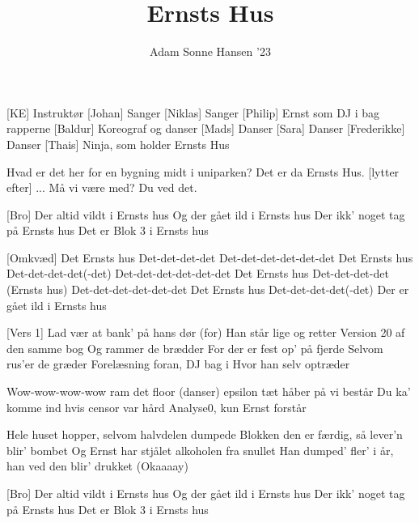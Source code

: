 \documentclass[a4paper,11pt]{article}
\title{Ernsts Hus}
\author{Adam Sonne Hansen ’23}
\begin{document}
\maketitle

\begin{roles}
[KE] Instruktør
[Johan] Sanger
[Niklas] Sanger
[Philip] Ernst som DJ i bag rapperne
[Baldur] Koreograf og danser
[Mads] Danser
[Sara] Danser
[Frederikke] Danser 
[Thais] Ninja, som holder Ernsts Hus
\end{roles}

\begin{song}

 Hvad er det her for en bygning midt i uniparken? 
 Det er da Ernsts Hus.
 [lytter efter] ... Må vi være med?
 Du ved det.

[Bro] Der altid vildt i Ernsts hus
 Og der gået ild i Ernsts hus
 Der ikk’ noget tag på Ernsts hus
Det er Blok 3 i Ernsts hus

[Omkvæd] Det Ernsts hus
Det-det-det-det
Det-det-det-det-det-det
Det Ernsts hus
Det-det-det-det(-det)
Det-det-det-det-det-det
Det Ernsts hus
Det-det-det-det (Ernsts hus)
Det-det-det-det-det-det
Det Ernsts hus
Det-det-det-det(-det)
Der er gået ild i Ernsts hus

[Vers 1] Lad vær at bank’ på hans dør
(for) Han står lige og retter
Version 20 af den samme bog
Og rammer de brædder
For der er fest op’ på fjerde
Selvom rus’er de græder
Forelæsning foran, DJ bag i
Hvor han selv optræder


 Wow-wow-wow-wow ram det floor
(danser) epsilon tæt håber på vi består
Du ka’ komme ind hvis censor var hård
Analyse0, kun Ernst forstår

 Hele huset hopper, selvom halvdelen dumpede
Blokken den er færdig, så lever’n blir’ bombet
Og Ernst har stjålet alkoholen fra snullet
Han dumped’ fler’ i år, han ved den blir’ drukket (Okaaaay)

[Bro] Der altid vildt i Ernsts hus
 Og der gået ild i Ernsts hus
 Der ikk’ noget tag på Ernsts hus
Det er Blok 3 i Ernsts hus


\end{song}
\end{document}
